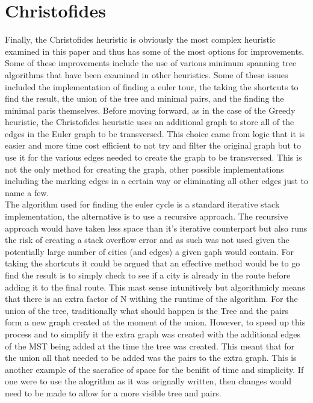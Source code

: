 \documentclass[midd]{thesis}
\newcommand{\tab}{\hspace*{2em}}
\begin{document}
\section{Christofides}
\tab Finally, the Christofides heuristic is obviously the most complex heuristic examined in this paper and thus has some of the most options for improvements. Some of these improvements include the use of various minimum spanning tree algorithms that have been examined in other heuristics. Some of these issues included the implementation of finding a euler tour, the taking the shortcuts to find the result, the union of the tree and minimal pairs, and the finding the minimal paris themselves. Before moving forward, as in the case of the Greedy heuristic, the Christofides heuristic uses an additional graph to store all of the edges in the Euler graph to be transversed. This choice came from logic that it is easier and more time cost efficient to not try and filter the original graph but to use it for the various edges needed to create the graph to be transversed. This is not the only method for creating the graph, other possible implementations including the marking edges in a certain way or eliminating all other edges just to name a few.\\
\tab The algorithm used for finding the euler cycle is a standard iterative stack implementation, the alternative is to use a recursive approach. The recursive approach would have taken less space than it's iterative counterpart but also runs the risk of creating a stack overflow error and as such was not used given the potentially large number of cities (and edges) a given gaph would contain. For taking the shortcuts it could be argued that an effective method would be to go find the result is to simply check to see if a city is already in the route before adding it to the final route. This mast sense intunitively but algorithmicly means that there is an extra factor of N withing the runtime of the algorithm. For the union of the tree, traditionally what should happen is the Tree and the pairs form a new graph created at the moment of the union. However, to speed up this process and to simplify it the extra graph was created with the additional edges of the MST being added at the time the tree was created. This meant that for the union all that needed to be added was the pairs to the extra graph. This is another example of the sacrafice of space for the benifit of time and simplicity. If one were to use the alogrithm as it was orignally written, then changes would need to be made to allow for a more visible tree and pairs.\\
\end{document}
